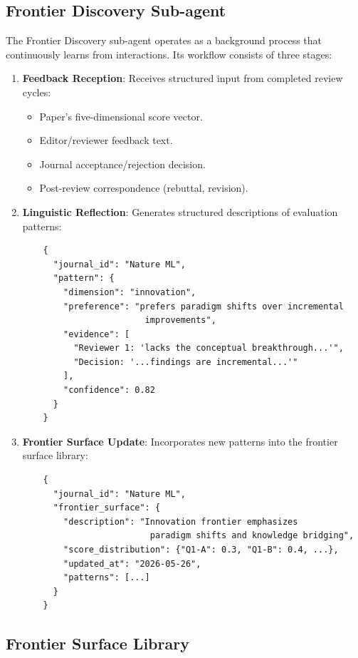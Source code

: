 \documentclass[11pt,a4paper]{article}
\newcommand{\subagent}{sub-agent}
\begin{document}
\subsection{Frontier Discovery Sub-agent}

The Frontier Discovery \subagent{} operates as a background process that continuously learns from interactions. Its workflow consists of three stages:

\begin{enumerate}
    \item \textbf{Feedback Reception}: Receives structured input from completed review cycles:
    \begin{itemize}
        \item Paper's five-dimensional score vector.
        \item Editor/reviewer feedback text.
        \item Journal acceptance/rejection decision.
        \item Post-review correspondence (rebuttal, revision).
    \end{itemize}
    \item \textbf{Linguistic Reflection}: Generates structured descriptions of evaluation patterns:
    \begin{verbatim}
    {
      "journal_id": "Nature ML",
      "pattern": {
        "dimension": "innovation",
        "preference": "prefers paradigm shifts over incremental 
                        improvements",
        "evidence": [
          "Reviewer 1: 'lacks the conceptual breakthrough...'", 
          "Decision: '...findings are incremental...'"
        ],
        "confidence": 0.82
      }
    }
    \end{verbatim}
    \item \textbf{Frontier Surface Update}: Incorporates new patterns into the frontier surface library:
    \begin{verbatim}
    {
      "journal_id": "Nature ML",
      "frontier_surface": {
        "description": "Innovation frontier emphasizes 
                         paradigm shifts and knowledge bridging",
        "score_distribution": {"Q1-A": 0.3, "Q1-B": 0.4, ...},
        "updated_at": "2026-05-26",
        "patterns": [...]
      }
    }
    \end{verbatim}
\end{enumerate}

\subsection{Frontier Surface Library}
\end{document}
